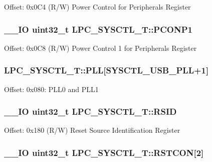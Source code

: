 Offset\+: 0x0\+C4 (R/\+W) Power Control for Peripherals Register \hypertarget{struct_l_p_c___s_y_s_c_t_l___t_a7e1241849ab9c934991342896ba7c296}{
\subsubsection[{P\+C\+O\+N\+P1}]{\setlength{\rightskip}{0pt plus 5cm}\+\_\+\+\_\+\+I\+O uint32\+\_\+t L\+P\+C\+\_\+\+S\+Y\+S\+C\+T\+L\+\_\+\+T\+::\+P\+C\+O\+N\+P1}}\label{struct_l_p_c___s_y_s_c_t_l___t_a7e1241849ab9c934991342896ba7c296}
Offset\+: 0x0\+C8 (R/\+W) Power Control 1 for Peripherals Register \hypertarget{struct_l_p_c___s_y_s_c_t_l___t_aabc2ad04761cf7c1cbfa8a43ddc91c84}{
\subsubsection[{P\+L\+L}]{ L\+P\+C\+\_\+\+S\+Y\+S\+C\+T\+L\+\_\+\+T\+::\+P\+L\+L\mbox{[}{\bf S\+Y\+S\+C\+T\+L\+\_\+\+U\+S\+B\+\_\+\+P\+L\+L}+1\mbox{]}}}\label{struct_l_p_c___s_y_s_c_t_l___t_aabc2ad04761cf7c1cbfa8a43ddc91c84}
Offset\+: 0x080\+: P\+L\+L0 and P\+L\+L1 \hypertarget{struct_l_p_c___s_y_s_c_t_l___t_a50cd4f8d03ea4b39516add82ac2dfd1a}{
\subsubsection[{R\+S\+I\+D}]{\setlength{\rightskip}{0pt plus 5cm}\+\_\+\+\_\+\+I\+O uint32\+\_\+t L\+P\+C\+\_\+\+S\+Y\+S\+C\+T\+L\+\_\+\+T\+::\+R\+S\+I\+D}}\label{struct_l_p_c___s_y_s_c_t_l___t_a50cd4f8d03ea4b39516add82ac2dfd1a}
Offset\+: 0x180 (R/\+W) Reset Source Identification Register \hypertarget{struct_l_p_c___s_y_s_c_t_l___t_ae7fbeba7b7acf3f7759d1de9eaf39ea1}{
\subsubsection[{R\+S\+T\+C\+O\+N}]{\setlength{\rightskip}{0pt plus 5cm}\+\_\+\+\_\+\+I\+O uint32\+\_\+t L\+P\+C\+\_\+\+S\+Y\+S\+C\+T\+L\+\_\+\+T\+::\+R\+S\+T\+C\+O\+N\mbox{[}2\mbox{]}}}\label{struct_l_p_c___s_y_s_c_t_l___t_ae7fbeba7b7acf3f7759d1de9eaf39ea1}
